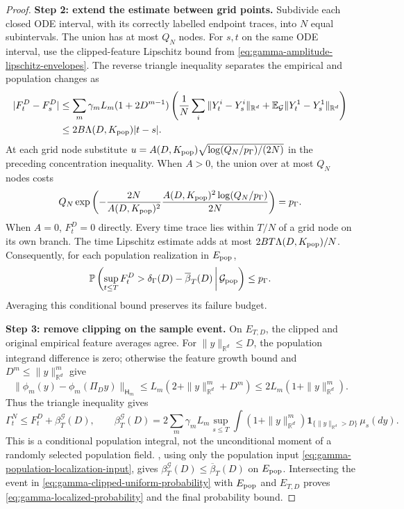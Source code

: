 \begin{proof}
\par\noindent\textbf{Step 2: extend the estimate between grid points.}
Subdivide each closed ODE interval, with its correctly labelled endpoint
traces, into $N$ equal subintervals.  The union has at most $Q_N$ nodes.
For $s,t$ on the same ODE interval, use the clipped-feature Lipschitz bound
from \eqref{eq:gamma-amplitude-lipschitz-envelopes}. The reverse triangle
inequality separates the empirical and population changes as
\[
\begin{aligned}
 |F_t^D-F_s^D|
 &\le\sum_m\gamma_mL_m(1+2D^{m-1})
 \left(\frac1N\sum_i\|Y_t^i-Y_s^i\|_{\mathbb R^d}
             +\mathbb E_{\mathcal G}\|Y_t^1-Y_s^1\|_{\mathbb R^d}\right)\\
 &\le2B\Lambda(D,K_{\rm pop})|t-s|.
\end{aligned}
\]
At each grid node substitute
$u=A(D,K_{\rm pop})\sqrt{\log(Q_N/p_\Gamma)/(2N)}$ in the preceding
concentration inequality. When $A>0$, the union over at most $Q_N$ nodes
costs
\[
 Q_N\exp\left(-\frac{2N}{A(D,K_{\rm pop})^2}
              \frac{A(D,K_{\rm pop})^2\log(Q_N/p_\Gamma)}{2N}\right)
 =p_\Gamma.
\]
When $A=0$, $F_t^D=0$ directly. Every time trace lies within $T/N$ of a
grid node on its own branch. The time Lipschitz estimate adds at most
$2BT\Lambda(D,K_{\rm pop})/N$. Consequently, for each population realization in $E_{\rm pop}$,
\begin{equation}
\label{eq:gamma-clipped-uniform-probability}
 \mathbb P\left(\sup_{t\le T}F_t^D>
 \delta_\Gamma(D)-\overline\beta_T(D)
 \,\middle|\,\mathcal G_{\rm pop}\right)\le p_\Gamma.
\end{equation}
Averaging this conditional bound preserves its failure budget.

\par\noindent\textbf{Step 3: remove clipping on the sample event.}
On $E_{T,D}$, the clipped and original empirical feature averages agree.
For $\|y\|_{\mathbb R^d}\le D$, the population integrand difference is zero; otherwise
the feature growth bound and $D^m\le\|y\|_{\mathbb R^d}^m$ give
\[
 \|\phi_m(y)-\phi_m(\Pi_Dy)\|_{\mathsf H_m}
 \le L_m(2+\|y\|_{\mathbb R^d}^m+D^m)\le2L_m(1+\|y\|_{\mathbb R^d}^m).
\]
Thus the triangle inequality gives
\begin{equation}
\label{eq:gamma-population-clipping-bias}
 \Gamma_t^N\le F_t^D+\beta_T^{\mathcal G}(D),\qquad
 \beta_T^{\mathcal G}(D)=
 2\sum_m\gamma_mL_m\sup_{s\le T}
 \int(1+\|y\|_{\mathbb R^d}^m)\mathbf1_{\{\|y\|_{\mathbb R^d}>D\}}\,\mu_s(dy).
\end{equation}
This is a conditional population integral, not the unconditional moment
of a randomly selected population field.  , using only the population input
\eqref{eq:gamma-population-localization-input}, gives
$\beta_T^{\mathcal G}(D)\le\overline\beta_T(D)$ on
$E_{\rm pop}$.  Intersecting the event in
\eqref{eq:gamma-clipped-uniform-probability} with $E_{\rm pop}$ and $E_{T,D}$ proves
\eqref{eq:gamma-localized-probability} and the final probability bound.
\end{proof}

